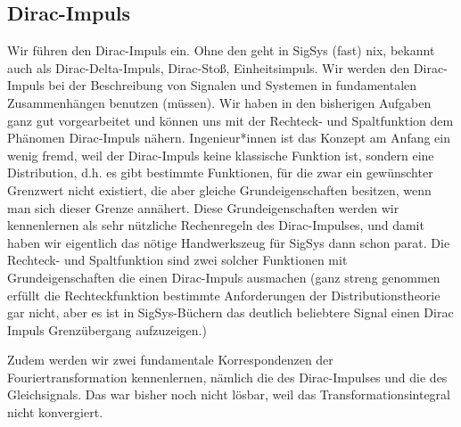 \newpage
\subsection{Dirac-Impuls}
\label{sec:D410BDAAE0}
\begin{Ziel}
Wir führen den Dirac-Impuls ein. Ohne den geht in SigSys (fast) nix, bekannt auch als
Dirac-Delta-Impuls, Dirac-Stoß, Einheitsimpuls.
Wir werden den Dirac-Impuls bei der Beschreibung von Signalen und Systemen
in fundamentalen Zusammenhängen benutzen (müssen).
Wir haben in den bisherigen Aufgaben ganz gut vorgearbeitet und können uns
mit der Rechteck- und Spaltfunktion dem Phänomen Dirac-Impuls nähern.
Ingenieur*innen ist das Konzept am Anfang ein wenig fremd, weil
der Dirac-Impuls keine klassische Funktion ist, sondern eine Distribution, d.h.
es gibt bestimmte Funktionen, für die zwar ein gewünschter Grenzwert nicht existiert,
die aber gleiche Grundeigenschaften besitzen, wenn man sich dieser Grenze annähert.
Diese Grundeigenschaften werden wir kennenlernen als sehr nützliche
Rechenregeln des Dirac-Impulses, und damit haben wir eigentlich das nötige
Handwerkszeug für SigSys dann schon parat.
Die Rechteck- und Spaltfunktion sind zwei solcher Funktionen mit
Grundeigenschaften die einen Dirac-Impuls ausmachen (ganz streng genommen erfüllt
die Rechteckfunktion bestimmte Anforderungen der Distributionstheorie gar nicht,
aber es ist in SigSys-Büchern das deutlich beliebtere Signal einen Dirac Impuls
Grenzübergang aufzuzeigen.)

Zudem werden wir zwei fundamentale Korrespondenzen der Fouriertransformation
kennenlernen, nämlich die des Dirac-Impulses und die des Gleichsignals. Das
war bisher noch nicht lösbar, weil das Transformationsintegral nicht konvergiert.
\end{Ziel}
